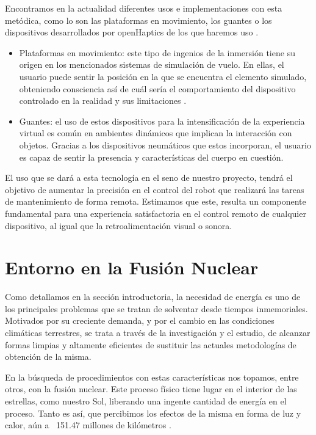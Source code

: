 Encontramos en la actualidad diferentes usos e implementaciones con esta metódica, como lo son las plataformas en movimiento, los guantes o los dispositivos desarrollados por openHaptics de los que haremos uso \cite{34}.

\begin{itemize}
    \item Plataformas en movimiento: este tipo de ingenios de la inmersión tiene su origen en los mencionados sistemas de simulación de vuelo. En ellas, el usuario puede sentir la posición en la que se encuentra el elemento simulado, obteniendo consciencia así de cuál sería el comportamiento del dispositivo controlado en la realidad y sus limitaciones . 
    
    \item Guantes: el uso de estos dispositivos para la intensificación de la experiencia virtual es común en ambientes dinámicos que implican la interacción con objetos. Gracias a los dispositivos neumáticos que estos incorporan, el usuario es capaz de sentir la presencia y características del cuerpo en cuestión. 
\end{itemize}

El uso que se dará a esta tecnología en el seno de nuestro proyecto, tendrá el objetivo de aumentar la precisión en el control del robot que realizará las tareas de mantenimiento de forma remota. Estimamos que este, resulta un componente fundamental para una experiencia satisfactoria en el control remoto de cualquier dispositivo, al igual que la retroalimentación visual o sonora.

\section{Entorno en la Fusión Nuclear}
 
Como detallamos en la sección introductoria, la necesidad de energía es uno de los principales problemas que se tratan de solventar desde tiempos inmemoriales. Motivados por su creciente demanda, y por el cambio en las condiciones climáticas terrestres, se trata a través de la investigación y el estudio, de alcanzar formas limpias y altamente eficientes de sustituir las actuales metodologías de obtención de la misma.

En la búsqueda de procedimientos con estas características nos topamos, entre otros, con la fusión nuclear. Este proceso físico tiene lugar en el interior de las estrellas, como nuestro Sol, liberando una ingente cantidad de energía en el proceso. Tanto es así, que percibimos los efectos de la misma en forma de luz y calor, aún a ~151.47 millones de kilómetros \cite{35}. 



